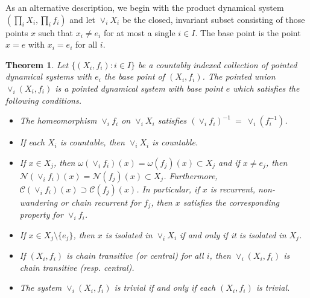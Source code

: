 \documentclass[12pt]{amsart}
\newtheorem{theo}{{\bfseries Theorem}}[section]
\def \N {\mathbb N}
\def \CC {\mathcal C}
\def \NN {\mathcal N}
\def \om {\omega}
\numberwithin{equation}{section}
\begin{document}
As an alternative description, we begin with the product dynamical system $(\prod_i  X_i, \prod_i  f_i)$ and let $\vee_i X_i$ be the
closed, invariant subset consisting
of those points $x$ such that $x_i \not= e_i$ for at most a single $i \in I$. The base point is the point $x = e$ with $x_i = e_i$ for all $i$.
%
\vspace{.25cm}


\begin{theo}\label{theo2.02} Let $\{ (X_i,f_i) : i \in I \}$ be a countably indexed collection of
pointed dynamical systems with $e_i$ the base point of $(X_i,f_i)$. The \emph{pointed union} $\vee_i (X_i,f_i)$
is a pointed dynamical system with base point $e$ which satisfies the following conditions.
 \begin{itemize}
 \item[(i)] The homeomorphism  $\vee_i f_i$  on $\vee_i X_i$ satisfies
 $(\vee_i f_i)^{-1} \ = \ \vee_i (f_i^{-1})$.

\item[(ii)] If each $X_i$ is countable, then $\vee_i X_i$ is countable.

 \item[(iii)] If $x \in X_j $, then $\om (\vee_i f_i)(x) = \om (f_j)(x) \subset X_j$ and if $x \not= e_j$, then
 $\NN (\vee_i f_i)(x) = \NN (f_j)(x) \subset X_j$. Furthermore, $\CC (\vee_i f_i)(x) \supset \CC (f_j)(x)$.
 In particular, if $x$ is recurrent, non-wandering or chain recurrent for $f_j$, then $x$ satisfies the
corresponding property for $\vee_i f_i$.

\item[(iv)] If $x \in X_j \setminus \{ e_j \}$, then $x$ is isolated in $\vee_i X_i$ if and only if it is isolated in $X_j$.


\item[(v)] If $(X_i,f_i)$ is chain transitive (or central) for all $i$, then $\vee_i (X_i,f_i)$ is chain transitive (resp. central).

\item[(vi)] The system $\vee_i (X_i,f_i)$ is trivial if and only if each $(X_i, f_i)$ is trivial.
\end{itemize}\end{theo}
\end{document}
